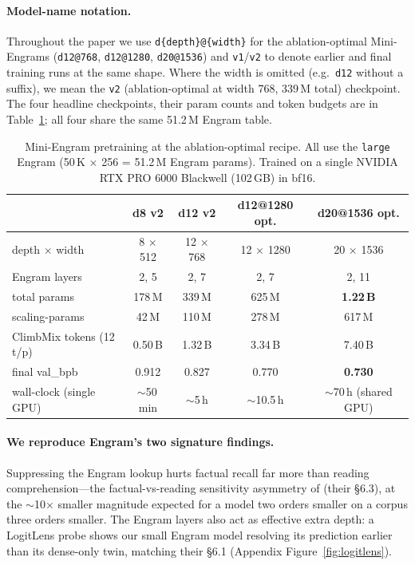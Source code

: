 \documentclass[letterpaper]{article} %
\begin{document}
\paragraph{Model-name notation.} Throughout the paper we use
\texttt{d\{depth\}@\{width\}} for the ablation-optimal Mini-Engrams
(\texttt{d12@768}, \texttt{d12@1280}, \texttt{d20@1536}) and
\texttt{v1}/\texttt{v2} to denote earlier and final training runs
at the same shape. Where the width is omitted (e.g.\ \texttt{d12}
without a suffix), we mean the \texttt{v2} (ablation-optimal at
width 768, 339\,M total) checkpoint. The four headline checkpoints,
their param counts and token budgets are in
Table~\ref{tab:miniengram}; all four share the same 51.2\,M Engram
table.

\begin{table}[t]
  \centering
  \caption{Mini-Engram pretraining at the ablation-optimal recipe.
  All use the \texttt{large} Engram (50\,K $\times$ 256 = 51.2\,M
  Engram params). Trained on a single NVIDIA RTX PRO 6000 Blackwell
  (102\,GB) in bf16.}
  \label{tab:miniengram}
  \begin{tabular}{lcccc}
    \toprule
     & d8 v2 & d12 v2 & \textbf{d12@1280 opt.} & \textbf{d20@1536 opt.} \\
    \midrule
    depth $\times$ width   & 8 $\times$ 512  & 12 $\times$ 768 & 12 $\times$ 1280 & 20 $\times$ 1536 \\
    Engram layers          & 2, 5            & 2, 7            & 2, 7             & 2, 11 \\
    total params           & 178\,M          & 339\,M          & 625\,M           & \textbf{1.22\,B} \\
    scaling-params         & 42\,M           & 110\,M          & 278\,M           & 617\,M \\
    ClimbMix tokens (12 t/p)& 0.50\,B         & 1.32\,B         & 3.34\,B          & 7.40\,B \\
    final val\_bpb         & 0.912           & 0.827           & 0.770            & \textbf{0.730} \\
    wall-clock (single GPU)& $\sim$50\,min   & $\sim$5\,h      & $\sim$10.5\,h    & $\sim$70\,h (shared GPU) \\
    \bottomrule
  \end{tabular}
\end{table}

\paragraph{We reproduce Engram's two signature findings.}
Suppressing the Engram lookup hurts factual recall far more than
reading comprehension---the factual-vs-reading sensitivity
asymmetry of \citet{cheng2026engram} (their \S6.3), at the
$\sim$10$\times$ smaller magnitude expected for a model two
orders smaller on a corpus three orders smaller. The Engram
layers also act as effective extra depth: a LogitLens probe shows
our small Engram model resolving its prediction earlier than its
dense-only twin, matching their \S6.1 (Appendix
Figure~\ref{fig:logitlens}).
\end{document}
